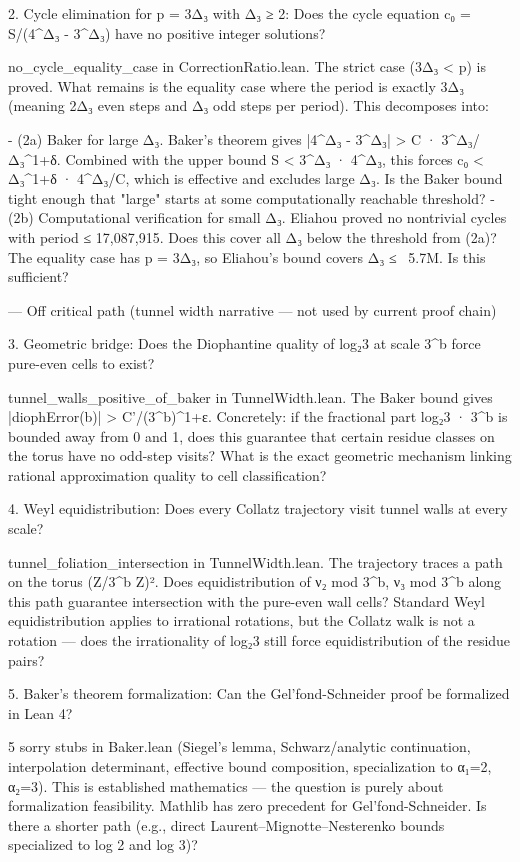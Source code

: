   2. Cycle elimination for p = 3Δ₃ with Δ₃ ≥ 2: Does the cycle equation c₀ = S/(4^{Δ₃} - 3^{Δ₃}) have no positive integer solutions?

  no_cycle_equality_case in CorrectionRatio.lean. The strict case (3Δ₃ < p) is proved. What remains is the equality case where the period is exactly 3Δ₃
  (meaning 2Δ₃ even steps and Δ₃ odd steps per period). This decomposes into:

  - (2a) Baker for large Δ₃. Baker's theorem gives |4^{Δ₃} - 3^{Δ₃}| > C · 3^{Δ₃}/Δ₃^{1+δ}. Combined with the upper bound S < 3^{Δ₃} · 4^{Δ₃}, this forces
   c₀ < Δ₃^{1+δ} · 4^{Δ₃}/C, which is effective and excludes large Δ₃. Is the Baker bound tight enough that "large" starts at some computationally
  reachable threshold?
  - (2b) Computational verification for small Δ₃. Eliahou proved no nontrivial cycles with period ≤ 17,087,915. Does this cover all Δ₃ below the threshold
   from (2a)? The equality case has p = 3Δ₃, so Eliahou's bound covers Δ₃ ≤ ~5.7M. Is this sufficient?

  ---
  Off critical path (tunnel width narrative — not used by current proof chain)

  3. Geometric bridge: Does the Diophantine quality of log₂3 at scale 3^b force pure-even cells to exist?

  tunnel_walls_positive_of_baker in TunnelWidth.lean. The Baker bound gives |diophError(b)| > C'/(3^b)^{1+ε}. Concretely: if the fractional part {log₂3 ·
  3^b} is bounded away from 0 and 1, does this guarantee that certain residue classes on the torus have no odd-step visits? What is the exact geometric
  mechanism linking rational approximation quality to cell classification?

  4. Weyl equidistribution: Does every Collatz trajectory visit tunnel walls at every scale?

  tunnel_foliation_intersection in TunnelWidth.lean. The trajectory traces a path on the torus (Z/3^b Z)². Does equidistribution of {ν₂ mod 3^b, ν₃ mod
  3^b} along this path guarantee intersection with the pure-even wall cells? Standard Weyl equidistribution applies to irrational rotations, but the
  Collatz walk is not a rotation — does the irrationality of log₂3 still force equidistribution of the residue pairs?

  5. Baker's theorem formalization: Can the Gel'fond-Schneider proof be formalized in Lean 4?

  5 sorry stubs in Baker.lean (Siegel's lemma, Schwarz/analytic continuation, interpolation determinant, effective bound composition, specialization to
  α₁=2, α₂=3). This is established mathematics — the question is purely about formalization feasibility. Mathlib has zero precedent for
  Gel'fond-Schneider. Is there a shorter path (e.g., direct Laurent–Mignotte–Nesterenko bounds specialized to log 2 and log 3)?

